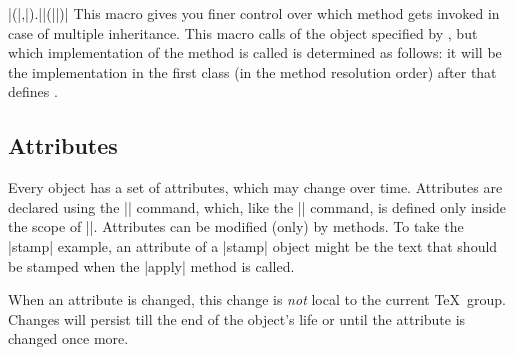 \begin{pgfmanualentry}
\begin{command}{\pgfoothis}
    \end{command}
\end{pgfmanualentry}

\begin{command}{\pgfoosuper|(|,|).||(||)|}
    This macro gives you finer control over which method gets invoked in case
    of multiple inheritance. This macro calls  of the object
    specified by , but which implementation of the method
    is called is determined as follows: it will be the implementation in the
    first class (in the method resolution order) after  that
    defines .
\end{command}


\subsection{Attributes}

Every object has a set of attributes, which may change over time. Attributes
are declared using the |\attribute| command, which, like the |\method| command,
is defined only inside the scope of |\pgfooclass|. Attributes can be modified
(only) by methods. To take the |stamp| example, an attribute of a |stamp|
object might be the text that should be stamped when the |apply| method is
called.

When an attribute is changed, this change is \emph{not} local to the current
\TeX\ group. Changes will persist till the end of the object's life or until
the attribute is changed once more.

